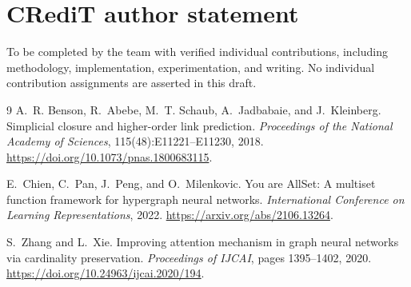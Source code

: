 \documentclass{article}
\begin{document}
\clearpage
\section{CRediT author statement}
To be completed by the team with verified individual contributions, including methodology, implementation, experimentation, and writing. No individual contribution assignments are asserted in this draft.

\clearpage
\begin{thebibliography}{9}
A.~R. Benson, R.~Abebe, M.~T. Schaub, A.~Jadbabaie, and J.~Kleinberg.
Simplicial closure and higher-order link prediction.
\emph{Proceedings of the National Academy of Sciences}, 115(48):E11221--E11230, 2018.
\url{https://doi.org/10.1073/pnas.1800683115}.

E.~Chien, C.~Pan, J.~Peng, and O.~Milenkovic.
You are AllSet: A multiset function framework for hypergraph neural networks.
\emph{International Conference on Learning Representations}, 2022.
\url{https://arxiv.org/abs/2106.13264}.

S.~Zhang and L.~Xie.
Improving attention mechanism in graph neural networks via cardinality preservation.
\emph{Proceedings of IJCAI}, pages 1395--1402, 2020.
\url{https://doi.org/10.24963/ijcai.2020/194}.
\end{thebibliography}
\end{document}
